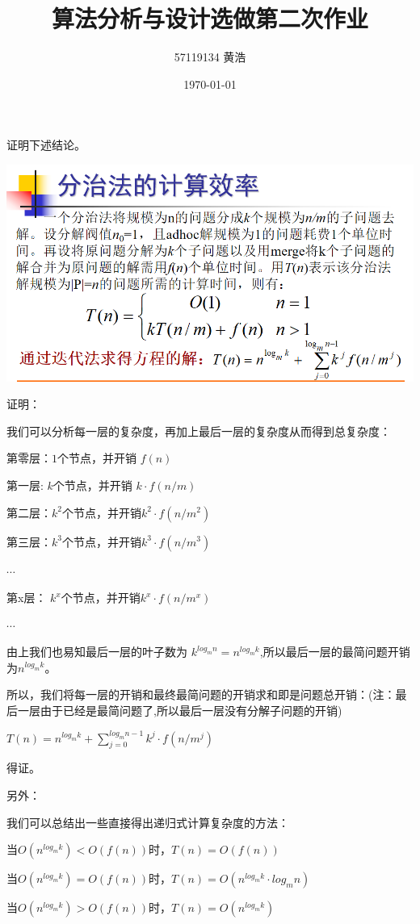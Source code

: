 \documentclass[UTF8]{ctexart}
\title{算法分析与设计选做第二次作业}
\author{57119134 黄浩}
\date{\today}
\begin{document}
\maketitle

证明下述结论。

\includegraphics[width = 1\textwidth]{1.png}

证明：

\qquad 我们可以分析每一层的复杂度，再加上最后一层的复杂度从而得到总复杂度：

\qquad 第零层：$1$个节点，并开销 $f(n)$

\qquad 第一层: $k$个节点，并开销 $k\cdot f(n/m)$

\qquad 第二层：$k^2$个节点，并开销$k^2 \cdot f(n/m^2)$

\qquad 第三层：$k^3$个节点，并开销$k^3 \cdot f(n/m^3)$

\qquad $\cdots$

\qquad 第x层： $k^x$个节点，并开销$k^x \cdot f(n/m^x)$

\qquad $\cdots$

\qquad 由上我们也易知最后一层的叶子数为 $k^{log_mn} = n^{log_mk}$,所以最后一层的最简问题开销为$n^{log_mk}$。

\qquad 所以，我们将每一层的开销和最终最简问题的开销求和即是问题总开销：(注：最后一层由于已经是最简问题了,所以最后一层没有分解子问题的开销)

\qquad $T(n) = n^{log_mk} + \sum_{j = 0}^{log_mn - 1}k^j \cdot f(n/m^j)$

\qquad 得证。

另外：

\qquad 我们可以总结出一些直接得出递归式计算复杂度的方法：

\qquad 当$O(n^{log_mk}) < O(f(n))$时，$T(n) = O(f(n))$

\qquad 当$O(n^{log_mk}) = O(f(n))$时，$T(n) = O(n^{log_mk} \cdot log_mn)$

\qquad 当$O(n^{log_mk}) > O(f(n))$时，$T(n) = O(n^{log_mk})$
\end{document}
